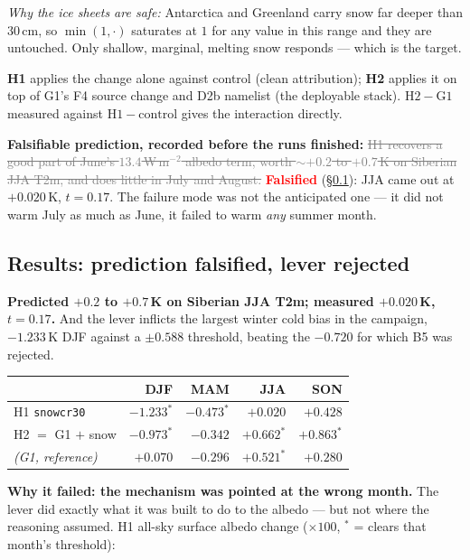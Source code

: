 \documentclass[10pt]{article}
\newcommand{\dead}[1]{\textcolor{gray}{\sout{#1}}}
\begin{document}
\emph{Why the ice sheets are safe:} Antarctica and Greenland carry snow far deeper than
$30$\,cm, so $\min(1,\cdot)$ saturates at $1$ for any value in this range and they are
untouched. Only shallow, marginal, melting snow responds --- which is the target.

\textbf{H1} applies the change alone against control (clean attribution); \textbf{H2} applies
it on top of G1's F4 source change and D2b namelist (the deployable stack). $\mathrm{H2}-
\mathrm{G1}$ measured against $\mathrm{H1}-\mathrm{control}$ gives the interaction directly.

\textbf{Falsifiable prediction, recorded before the runs finished:}
\dead{H1 recovers a good part of June's $13.4$\,W\,m$^{-2}$ albedo term, worth
${\sim}+0.2$ to $+0.7$\,K on Siberian JJA T2m, and does little in July and August.}
\textcolor{red}{\textbf{Falsified}} (\S\ref{sub:hres}): JJA came out at $+0.020$\,K,
$t=0.17$. The failure mode was not the anticipated one --- it did not warm July as much as
June, it failed to warm \emph{any} summer month.

\subsection{Results: prediction falsified, lever rejected}\label{sub:hres}
\textbf{Predicted $+0.2$ to $+0.7$\,K on Siberian JJA T2m; measured $+0.020$\,K, $t=0.17$.}
And the lever inflicts the largest winter cold bias in the campaign, $-1.233$\,K DJF against a
$\pm0.588$ threshold, beating the $-0.720$ for which B5 was rejected.

\begin{center}\footnotesize
\begin{tabular}{l r r r r}
\toprule
 & DJF & MAM & JJA & SON \\
\midrule
H1 \texttt{snowcr30} & $\mathbf{-1.233}^{*}$ & $-0.473^{*}$ & $\mathbf{+0.020}$ & $+0.428$ \\
H2 $=$ G1 $+$ snow & $-0.973^{*}$ & $-0.342$ & $+0.662^{*}$ & $+0.863^{*}$ \\
\emph{(G1, reference)} & $+0.070$ & $-0.296$ & $+0.521^{*}$ & $+0.280$ \\
\bottomrule
\end{tabular}
\end{center}

\noindent\textbf{Why it failed: the mechanism was pointed at the wrong month.} The lever did
exactly what it was built to do to the albedo --- but not where the reasoning assumed. H1
all-sky surface albedo change ($\times 100$, ${}^{*}$ = clears that month's threshold):
\end{document}
